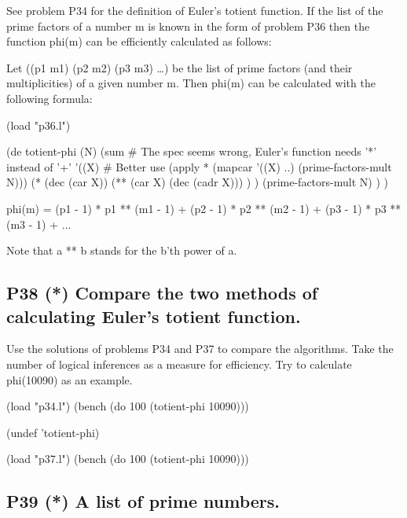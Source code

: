 See problem P34 for the definition of Euler's totient function. If the
list of the prime factors of a number m is known in the form of problem
P36 then the function phi(m) can be efficiently calculated as
follows:

 Let ((p1 m1) (p2 m2) (p3 m3) \ldots{}) be the list of prime
factors (and their multiplicities) of a given number m. Then phi(m) can
be calculated with the following formula:

\begin{wideverbatim}

(load "p36.l")

(de totient-phi (N)
   (sum  # The spec seems wrong, Euler's function needs '*' instead of '+'
      '((X)  # Better use (apply * (mapcar '((X) ..) (prime-factors-mult N)))
         (*
            (dec (car X))
            (** (car X) (dec (cadr X))) ) )
      (prime-factors-mult N) ) )

\end{wideverbatim}

\begin{wideverbatim}
  phi(m) = (p1 - 1) * p1 ** (m1 - 1) + (p2 - 1) * p2 ** (m2 - 1) +
  (p3  - 1) * p3 ** (m3 - 1) + ...
\end{wideverbatim}

Note that a ** b stands for the b'th power of a.

\subsection*{{P38} (*) Compare the two methods of
calculating Euler's totient function.}
\label{sec:99-problems-P38}

Use the solutions of problems P34 and P37 to compare the algorithms.
Take the number of logical inferences as a measure for efficiency. Try
to calculate phi(10090) as an example.

\begin{wideverbatim}

(load "p34.l")
(bench (do 100 (totient-phi 10090)))

(undef 'totient-phi)

(load "p37.l")
(bench (do 100 (totient-phi 10090)))

\end{wideverbatim}

\pagebreak{}
\subsection*{{P39} (*) A list of prime numbers.}
\label{sec:99-problems-P39}

